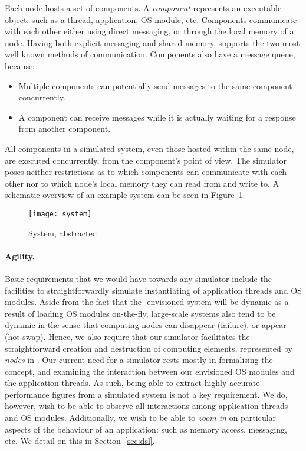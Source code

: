 Each node hosts a set of components.
A \emph{component} represents an executable object: such as a thread, application, OS module, etc.
Components communicate with each other either using direct messaging, or through the local memory of a node.
Having both explicit messaging and shared memory, 
\soosim supports the two most well known methods of communication.
Components also have a message queue, because:
\begin{itemize}
  \item Multiple components can potentially send messages to the same component concurrently.
  \item A component can receive messages while it is actually waiting for a response from another component.
\end{itemize}
All components in a simulated system, even those hosted within the same node, are executed concurrently, from the component's point of view.
The simulator poses neither restrictions as to which components can communicate with each other nor to which node's local memory they can read from and write to.
A schematic overview of an example system can be seen in Figure~\ref{fig:system}.

\begin{figure}
\centering
%
\texttt{[image: system]}
\caption{System, abstracted.}
\label{fig:system}
\end{figure}

\paragraph{Agility.}
Basic requirements that we would have towards any simulator include the facilities to straightforwardly simulate instantiating of application threads and OS modules.
Aside from the fact that the \soos-envisioned system will be dynamic as a result of loading OS modules on-the-fly, large-scale systems also tend to be dynamic in the sense that computing nodes can disappear (failure), or
appear (hot-swap).
Hence, we also require that our simulator facilitates the straightforward creation and destruction of computing elements, represented by \emph{nodes} in \soosim.
Our current need for a simulator rests mostly in formalising the \soos concept, and examining the interaction between our envisioned OS modules and the application threads.
As such, being able to extract highly accurate performance figures from a simulated system is not a key requirement.
We do, however, wish to be able to observe all interactions among application threads and OS modules.
Additionally, we wish to be able to \emph{zoom in} on particular aspects of the behaviour of an application: such as memory access, messaging, etc.
We detail on this in Section~\ref{sec:dsl}.

